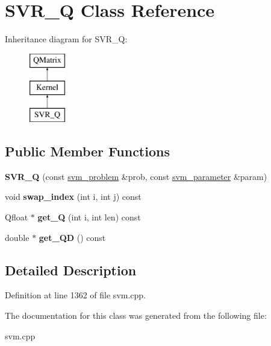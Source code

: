 \hypertarget{class_s_v_r___q}{
\section{SVR\_\-Q Class Reference}
\label{class_s_v_r___q}
}
Inheritance diagram for SVR\_\-Q:\begin{figure}[H]
\begin{center}
\leavevmode
\includegraphics[height=3cm]{class_s_v_r___q}
\end{center}
\end{figure}
\subsection*{Public Member Functions}
\begin{DoxyCompactItemize}
\item 
\hypertarget{class_s_v_r___q_a348978e0cce4c0bf503dc825241eb4ff}{
{\bfseries SVR\_\-Q} (const \hyperlink{structsvm__problem}{svm\_\-problem} \&prob, const \hyperlink{structsvm__parameter}{svm\_\-parameter} \&param)}
\label{class_s_v_r___q_a348978e0cce4c0bf503dc825241eb4ff}

\item 
\hypertarget{class_s_v_r___q_a9d3884f0c68f4ce18d47570e4a203405}{
void {\bfseries swap\_\-index} (int i, int j) const }
\label{class_s_v_r___q_a9d3884f0c68f4ce18d47570e4a203405}

\item 
\hypertarget{class_s_v_r___q_aba55078d17e7815f093ffa154f3cee9d}{
Qfloat $\ast$ {\bfseries get\_\-Q} (int i, int len) const }
\label{class_s_v_r___q_aba55078d17e7815f093ffa154f3cee9d}

\item 
\hypertarget{class_s_v_r___q_ac22ed5ce1b0bf6a900c3c8d631e77d76}{
double $\ast$ {\bfseries get\_\-QD} () const }
\label{class_s_v_r___q_ac22ed5ce1b0bf6a900c3c8d631e77d76}

\end{DoxyCompactItemize}


\subsection{Detailed Description}


Definition at line 1362 of file svm.cpp.



The documentation for this class was generated from the following file:\begin{DoxyCompactItemize}
\item 
svm.cpp\end{DoxyCompactItemize}
